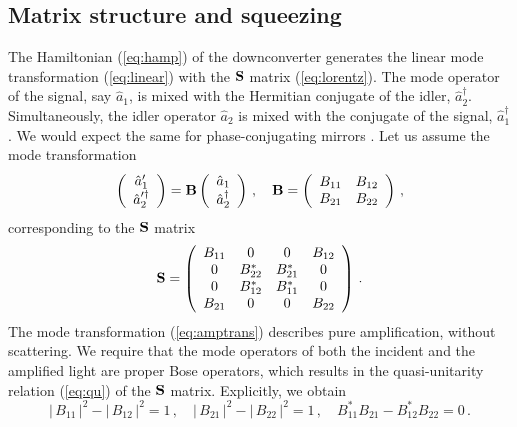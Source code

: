 \documentclass[12pt,amsmath,amssymb]{article}
\def\underline#1{{\bf #1}}
\numberwithin{equation}{section}
\begin{document}
\subsection{Matrix structure and squeezing}

The Hamiltonian (\ref{eq:hamp}) of the downconverter generates
the linear mode transformation (\ref{eq:linear}) with the
$\underline{S}$ matrix (\ref{eq:lorentz}). The mode operator of
the signal, say $\hat{a}_1$, is mixed with the Hermitian
conjugate of the idler, $\hat{a}_2^\dagger$. Simultaneously, the
idler operator $\hat{a}_2$ is mixed with the conjugate of the
signal, $\hat{a}_1^\dagger$. We would expect the same for
phase-conjugating mirrors \cite{Shen}. Let us assume the mode
transformation
\begin{equation}
\label{eq:amptrans} \left(
    \begin{array}{c}
     \hat{a}_1'  \\
     \hat{a}_2'^\dagger
    \end{array}
\right) = \underline{B} \left(
    \begin{array}{c}
     \hat{a}_1  \\
     \hat{a}_2^\dagger
    \end{array}
\right)\,,\quad \underline{B} = \left(
    \begin{array}{cc}
      B_{11} & B_{12} \\
      B_{21} & B_{22}
    \end{array}
\right)\,,
\end{equation}
corresponding to the $\underline{S}$ matrix
\begin{equation}
\label{eq:amps}
\underline{S} =
    \left(
    \begin{array}{cccc}
      B_{11}&0&0&B_{12}\\ 0&B_{22}^*&B_{21}^*&0\\
      0&B_{12}^*&B_{11}^*&0\\ B_{21}&0&0&B_{22}
    \end{array}
\right) \,.
\end{equation}
The mode transformation (\ref{eq:amptrans}) describes pure
amplification, without scattering. We require that the mode
operators of both the incident and the amplified light are proper
Bose operators, which results in the quasi-unitarity relation
(\ref{eq:qu}) of the $\underline{S}$ matrix. Explicitly, we
obtain
\begin{equation}
|\,B_{11}\,|^2-|\,B_{12}\,|^2=1\,,\quad
|\,B_{21}\,|^2-|\,B_{22}\,|^2=1\,,\quad
B_{11}^*B_{21}-B_{12}^*B_{22}=0\,.
\end{equation}
\end{document}
